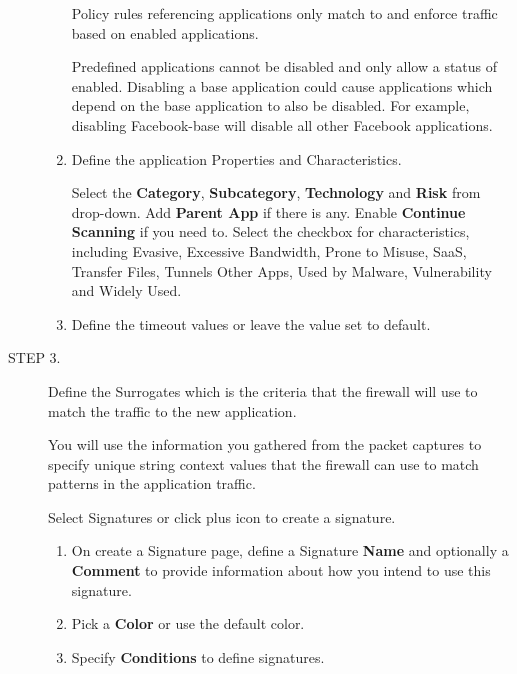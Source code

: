 \begin{description}
\begin{enumerate}
            Policy rules referencing applications only match to and enforce traffic based on enabled applications. 
        
        
            Predefined applications cannot be disabled and only allow a status of enabled. Disabling a base application could cause applications which depend on the base application to also be disabled. For example, disabling Facebook-base will disable all other Facebook applications.
        \item Define the application Properties and Characteristics.
        

            Select the \textbf{Category}, \textbf{Subcategory}, \textbf{Technology} and \textbf{Risk} from drop-down. Add \textbf{Parent App} if there is any. Enable \textbf{Continue Scanning} if you need to. Select the checkbox for characteristics, including Evasive, Excessive Bandwidth, Prone to Misuse, SaaS, Transfer Files, Tunnels Other Apps, Used by Malware, Vulnerability and Widely Used.
        \item Define the timeout values or leave the value set to default.
    \end{enumerate}
    \item[STEP 3.]	Define the Surrogates which is the criteria that the firewall will use to match the traffic to the new application.


        You will use the information you gathered from the packet captures to specify unique string context values that the firewall can use to match patterns in the application traffic.
             
        
        Select Signatures or click plus icon to create a signature.
    \begin{enumerate}
        \item On create a Signature page, define a Signature \textbf{Name} and optionally a \textbf{Comment} to provide information about how you intend to use this signature.
        \item Pick a \textbf{Color} or use the default color.
        \item Specify \textbf{Conditions} to define signatures.
        


\end{enumerate}
\end{description}
